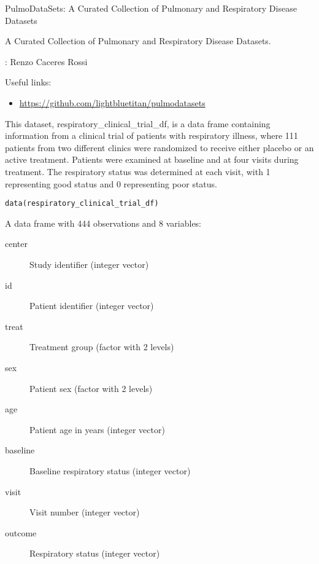 \documentclass[a4paper]{book}
\begin{document}
%
\begin{Details}
PulmoDataSets: A Curated Collection of Pulmonary and Respiratory Disease Datasets



A Curated Collection of Pulmonary and Respiratory Disease Datasets.
\end{Details}
%
\begin{Author}

: Renzo Caceres Rossi 

\end{Author}
%
\begin{SeeAlso}

Useful links:
\begin{itemize}

\item{} \url{https://github.com/lightbluetitan/pulmodatasets}

\end{itemize}


\end{SeeAlso}
%
\begin{Description}
This dataset, respiratory\_clinical\_trial\_df, is a data frame containing information from a clinical trial
of patients with respiratory illness, where 111 patients from two different clinics were randomized to receive
either placebo or an active treatment. Patients were examined at baseline and at four visits during treatment.
The respiratory status was determined at each visit, with 1 representing good status and 0 representing poor status.
\end{Description}
%
\begin{Usage}
\begin{verbatim}
data(respiratory_clinical_trial_df)
\end{verbatim}
\end{Usage}
%
\begin{Format}
A data frame with 444 observations and 8 variables:
\begin{description}

\item[center] Study identifier (integer vector)
\item[id] Patient identifier (integer vector)
\item[treat] Treatment group (factor with 2 levels)
\item[sex] Patient sex (factor with 2 levels)
\item[age] Patient age in years (integer vector)
\item[baseline] Baseline respiratory status (integer vector)
\item[visit] Visit number (integer vector)
\item[outcome] Respiratory status (integer vector)

\end{description}

\end{Format}
\end{document}
